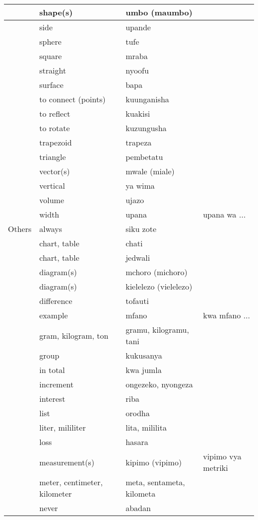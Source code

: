 \begin{center}
\begin{longtable}{|m{2cm}|m{4cm}|m{4cm}|m{4cm}|}
	&	shape(s)	&	umbo (maumbo)	&		\\	\hline
	&	side	&	upande	&		\\	\hline
	&	sphere	&	tufe	&		\\	\hline
	&	square	&	mraba	&		\\	\hline
	&	straight	&	nyoofu	&		\\	\hline
	&	surface	&	bapa	&		\\	\hline
	&	to connect (points)	&	kuunganisha	&		\\	\hline
	&	to reflect	&	kuakisi	&		\\	\hline
	&	to rotate	&	kuzungusha	&		\\	\hline
	&	trapezoid	&	trapeza	&		\\	\hline
	&	triangle	&	pembetatu	&		\\	\hline
	&	vector(s)	&	mwale (miale)	&		\\	\hline
	&	vertical	&	ya wima	&		\\	\hline
	&	volume	&	ujazo	&		\\	\hline
	&	width	&	upana	&	upana wa $\ldots$	\\	\hline
Others	&	always	&	siku zote	&		\\	\hline
	&	chart, table	&	chati	&		\\	\hline
	&	chart, table	&	jedwali	&		\\	\hline
	&	diagram(s)	&	mchoro (michoro)	&		\\	\hline
	&	diagram(s)	&	kielelezo (vielelezo)	&		\\	\hline
	&	difference	&	tofauti	&		\\	\hline
	&	example	&	mfano	&	kwa mfano $\ldots$	\\	\hline
	&	gram, kilogram, ton	&	gramu, kilogramu, tani	&		\\	\hline
	&	group	&	kukusanya	&		\\	\hline
	&	in total	&	kwa jumla	&		\\	\hline
	&	increment	&	ongezeko, nyongeza	&		\\	\hline
	&	interest	&	riba	&		\\	\hline
	&	list	&	orodha	&		\\	\hline
	&	liter, mililiter	&	lita, mililita	&		\\	\hline
	&	loss	&	hasara	&		\\	\hline
	&	measurement(s)	&	kipimo (vipimo)	&	vipimo vya metriki	\\	\hline
	&	meter, centimeter, kilometer	&	meta, sentameta, kilometa	&		\\	\hline
	&	never	&	abadan	&		\\	\hline

\end{longtable}
\end{center}

